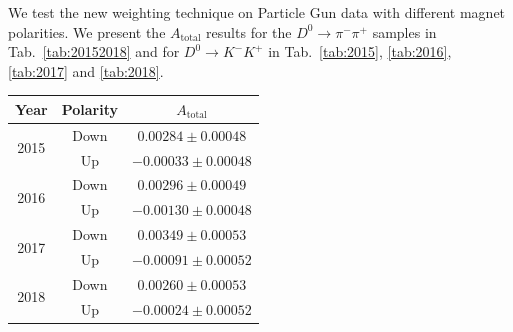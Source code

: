 \documentclass{article}
\begin{document}
        We test the new weighting technique on Particle Gun data with different magnet polarities.
        We present the $A_\text{total}$ results for the $D^0\to \pi^-\pi^+$ samples in Tab.~\ref{tab:20152018} and for $D^0\to K^-K^+$ in Tab.~\ref{tab:2015}, \ref{tab:2016}, \ref{tab:2017} and \ref{tab:2018}.
        \begin{center}
                \begin{tabular}{c|c|c}
                        Year & Polarity & $A_\text{total}$\\
                        \hline\hline
                        \multirow{2}{*}{2015} & Down & $0.00284 \pm 0.00048$\\
                        \cline{2-3}
                        & Up & $-0.00033\pm 0.00048$\\
                        \hline
                        \multirow{2}{*}{2016} & Down & $0.00296\pm 0.00049$\\
                        \cline{2-3}
                        & Up & $-0.00130\pm 0.00048$\\
                        \hline
                        \multirow{2}{*}{2017} & Down & $0.00349\pm 0.00053$\\
                        \cline{2-3}
                        & Up & $-0.00091\pm 0.00052$\\
                        \hline
                        \multirow{2}{*}{2018} & Down & $0.00260\pm 0.00053$\\
                        \cline{2-3}
                        & Up & $-0.00024\pm 0.00052$\\
                \end{tabular}
                \label{tab:20152018}
        \end{center}
\end{document}
